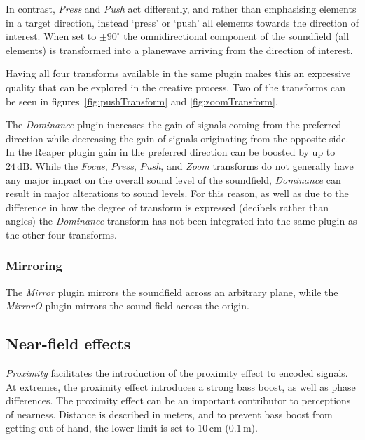 \documentclass{article}
\begin{document}
In contrast, \emph{Press} and \emph{Push} act differently, and rather than emphasising elements in a target direction, instead `press' or `push' all elements towards the direction of interest.
When set to $\pm90^\circ$ the omnidirectional component of the soundfield (all elements) is transformed into a planewave arriving from the direction of interest.



Having all four transforms available in the same plugin makes this an expressive quality that can be explored in the creative process.
Two of the transforms can be seen in figures~\ref{fig:pushTransform} and \ref{fig:zoomTransform}.

The \emph{Dominance} plugin increases the gain of signals coming from the preferred direction while decreasing the gain of signals originating from the opposite side.
In the Reaper plugin gain in the preferred direction can be boosted by up to $24\,\mathrm{dB}$.
While the \emph{Focus}, \emph{Press}, \emph{Push}, and \emph{Zoom} transforms do not generally have any major impact on the overall sound level of the soundfield, \emph{Dominance} can result in major alterations to sound levels.
For this reason, as well as due to the difference in how the degree of transform is expressed (decibels rather than angles) the \emph{Dominance} transform has not been integrated into the same plugin as the other four transforms.


\subsubsection{Mirroring}\label{sec:mirror}

The \emph{Mirror} plugin mirrors the soundfield across an arbitrary plane, while the \emph{MirrorO} plugin mirrors the sound field across the origin.



\subsection{Near-field effects}\label{sec:near-field}

\emph{Proximity} facilitates the introduction of the proximity effect to encoded signals.
At extremes, the proximity effect introduces a strong bass boost, as well as phase differences.
The proximity effect can be an important contributor to perceptions of nearness.
Distance is described in meters, and to prevent bass boost from getting out of hand, the lower limit is set to $10\,\mathrm{cm}$ ($0.1\,\mathrm{m}$).
\end{document}
